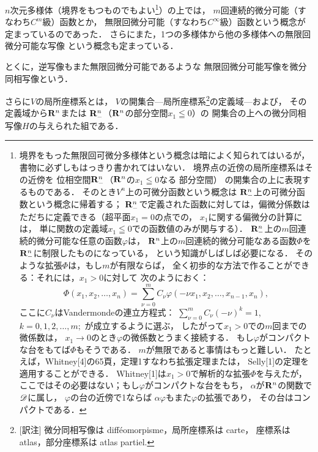\(n\)次元多様体（境界をもつものでもよい\footnote{
    境界をもった無限回可微分多様体という概念は暗によく知られてはいるが，
    書物に必ずしもはっきり書かれてはいない．
    境界点の近傍の局所座標系はその近傍を
    位相空間\(\mathbf{R}^n_-\)（\(\mathbf{R}^n\)の\(x_1\leqq0\)なる
    部分空間）
    の開集合の上に表現するものである．
    そのとき\(V^n\)上の可微分函数という概念は
    \(\mathbf{R}^n_-\)上の可微分函数という概念に帰着する；
    \(\mathbf{R}^n_-\)で定義された函数に対しては，偏微分係数は
    ただちに定義できる（超平面\(x_1=0\)の点での，
    \(x_1\)に関する偏微分の計算には，
    単に関数の定義域\(x_1\leqq0\)での函数値のみが関与する）．
    \(\mathbf{R}^n_-\)上の\(m\)回連続的微分可能な任意の函数\(\varphi\)は，\nopagebreak
    \(\mathbf{R}^n\)上の\(m\)回連続的微分可能なある函数\(\varPhi\)を\nopagebreak
    \(\mathbf{R}^n_-\)に制限したものになっている，\nopagebreak
    という知識がしばしば必要になる．
    そのような拡張\(\varPhi\)は，もし\(m\)が有限ならば，
    全く初歩的な方法で作ることができる：それには，\(x_1>0\)に対して
    次のようにおく：
    \[
        \varPhi(x_1,x_2,\ldots,x_n)
        =\sum_{\nu=0}^{m}
        C_\nu\varphi(-\nu{x_1},x_2,\ldots,x_{n-1},x_n),
    \]ここに\(C_\nu\)はVandermondeの連立方程式：
    \(\displaystyle
        \sum_{\nu=0}^{m}C_\nu(-\nu)^k=1
    \), 
    \(k=0,1,2,\dots,m;\)
    が成立するように選ぶ，
    したがって\(x_1>0\)での\(m\)回までの微係数は，
    \(x_1\to0\)のとき\(\varphi\)の微係数とうまく接続する．
    もし\(\varphi\)がコンパクトな台をもてば\(\varPhi\)もそうである．
    \(m\)が無限であると事情はもっと難しい．
    たとえば，Whitney[4]の65頁，定理1すなわち拡張定理または，
    Selly[1]の定理を適用することができる．
    Whitney[1]は\(x_1>0\)で解析的な拡張\(\varPhi\)を与えたが，
    ここではその必要はない；もし\(\varphi\)がコンパクトな台をもち，
    \(\alpha\)が\(\mathbf{R}^n\)の関数で\(\mathscr{D}\)に属し，
    \(\varphi\)の台の近傍で1ならば
    \(\alpha\varphi\)もまた\(\varphi\)の拡張であり，
    その台はコンパクトである．\nopagebreak
}）の上では，
\(m\)回連続的微分可能（すなわち\(C^m\)級）函数とか，
無限回微分可能（すなわち\(C^\infty\)級）函数という概念が
定まっているのであった．
さらにまた，1つの多様体から他の多様体への無限回微分可能な写像
という概念も定まっている．

とくに，逆写像もまた無限回微分可能であるような
無限回微分可能写像を微分同相写像という．

さらに\(V\)の局所座標系とは，
\(V\)の開集合---局所座標系\footnote{
    [訳注] 微分同相写像は diff\'eomorpisme，局所座標系は carte，
    座標系は atlas，部分座標系は atlas partiel.
}の定義域---および，
その定義域から\(\mathbf{R}^n\)または
\(\mathbf{R}^n_-\)（\(\mathbf{R}^n\)の部分空間\(x_1\leqq0\)）の
開集合の上への微分同相写像\(H\)の与えられた組である．














